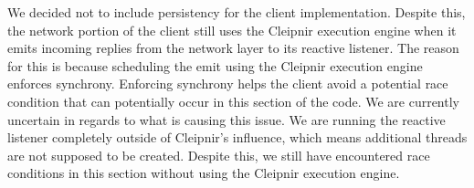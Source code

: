 We decided not to include persistency for the client implementation. Despite this, the network portion of the client still uses the Cleipnir execution engine when it emits incoming replies from the network layer to its reactive listener. The reason for this is because scheduling the emit using the Cleipnir execution engine enforces synchrony. Enforcing synchrony helps the client avoid a potential race condition that can potentially occur in this section of the code. We are currently uncertain in regards to what is causing this issue. We are running the reactive listener completely outside of Cleipnir’s influence, which means additional threads are not supposed to be created. Despite this, we still have encountered race conditions in this section without using the Cleipnir execution engine.
